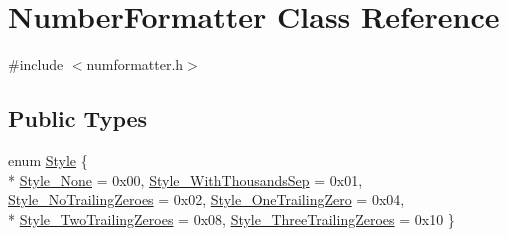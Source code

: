 \hypertarget{class_number_formatter}{}\section{Number\+Formatter Class Reference}
\label{class_number_formatter}


{\ttfamily \#include $<$numformatter.\+h$>$}

\subsection*{Public Types}
\begin{DoxyCompactItemize}
\item 
enum \hyperlink{class_number_formatter_abe9347e515a52a6b16988ba9919e1d19}{Style} \{ \\*
\hyperlink{class_number_formatter_abe9347e515a52a6b16988ba9919e1d19a6d2274867af77919614a8a285815252d}{Style\+\_\+\+None} = 0x00, 
\hyperlink{class_number_formatter_abe9347e515a52a6b16988ba9919e1d19af4480c7e796250247fb32e315b830369}{Style\+\_\+\+With\+Thousands\+Sep} = 0x01, 
\hyperlink{class_number_formatter_abe9347e515a52a6b16988ba9919e1d19a52e7a01879ddee23574eb5b822316d3d}{Style\+\_\+\+No\+Trailing\+Zeroes} = 0x02, 
\hyperlink{class_number_formatter_abe9347e515a52a6b16988ba9919e1d19a074bbbdf2021763e97eb1b426b4ec3a2}{Style\+\_\+\+One\+Trailing\+Zero} = 0x04, 
\\*
\hyperlink{class_number_formatter_abe9347e515a52a6b16988ba9919e1d19aae492b348567d41743cce29b52f78089}{Style\+\_\+\+Two\+Trailing\+Zeroes} = 0x08, 
\hyperlink{class_number_formatter_abe9347e515a52a6b16988ba9919e1d19a34f179bc976dc38712d6c4d38f0b6fdd}{Style\+\_\+\+Three\+Trailing\+Zeroes} = 0x10
 \}
\end{DoxyCompactItemize}
